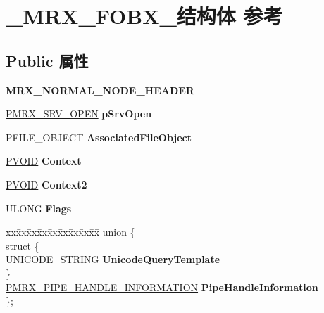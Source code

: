 \hypertarget{struct___m_r_x___f_o_b_x__}{}\section{\+\_\+\+M\+R\+X\+\_\+\+F\+O\+B\+X\+\_\+结构体 参考}
\label{struct___m_r_x___f_o_b_x__}
\subsection*{Public 属性}
\begin{DoxyCompactItemize}
\item 
\mbox{\label{struct___m_r_x___f_o_b_x___a9816669e3ab4158f8855a042a2924b23}} 
{\bfseries M\+R\+X\+\_\+\+N\+O\+R\+M\+A\+L\+\_\+\+N\+O\+D\+E\+\_\+\+H\+E\+A\+D\+ER}
\item 
\mbox{\label{struct___m_r_x___f_o_b_x___a70f4f6631a10418fd59aa7c4038a5b08}} 
\hyperlink{struct___m_r_x___s_r_v___o_p_e_n__}{P\+M\+R\+X\+\_\+\+S\+R\+V\+\_\+\+O\+P\+EN} {\bfseries p\+Srv\+Open}
\item 
\mbox{\label{struct___m_r_x___f_o_b_x___a956c3444155ca875d33c8842a7ffc8f4}} 
P\+F\+I\+L\+E\+\_\+\+O\+B\+J\+E\+CT {\bfseries Associated\+File\+Object}
\item 
\mbox{\label{struct___m_r_x___f_o_b_x___ab5a69bb7e79a056a77cee7804cb19171}} 
\hyperlink{interfacevoid}{P\+V\+O\+ID} {\bfseries Context}
\item 
\mbox{\label{struct___m_r_x___f_o_b_x___aafc399bbd985891b753df9cc4afd2cbf}} 
\hyperlink{interfacevoid}{P\+V\+O\+ID} {\bfseries Context2}
\item 
\mbox{\label{struct___m_r_x___f_o_b_x___aac33e699fa748681140cadccc3abeca0}} 
U\+L\+O\+NG {\bfseries Flags}
\item 
\mbox{\label{struct___m_r_x___f_o_b_x___ab6bc997866038030b1eec56b143d532e}} 
\begin{tabbing}
xx\=xx\=xx\=xx\=xx\=xx\=xx\=xx\=xx\=\kill
union \{\\
\mbox{\label{union___m_r_x___f_o_b_x___1_1_0D1712_a93219e77179fd1fb62ec73258e64d8ad}} 
\>struct \{\\
\>\>\hyperlink{struct___u_n_i_c_o_d_e___s_t_r_i_n_g}{UNICODE\_STRING} {\bfseries UnicodeQueryTemplate}\\
\>\} \\
\>\hyperlink{struct___m_r_x___p_i_p_e___h_a_n_d_l_e___i_n_f_o_r_m_a_t_i_o_n}{PMRX\_PIPE\_HANDLE\_INFORMATION} {\bfseries PipeHandleInformation}\\
\}; \\


\end{tabbing}
\end{DoxyCompactItemize}
